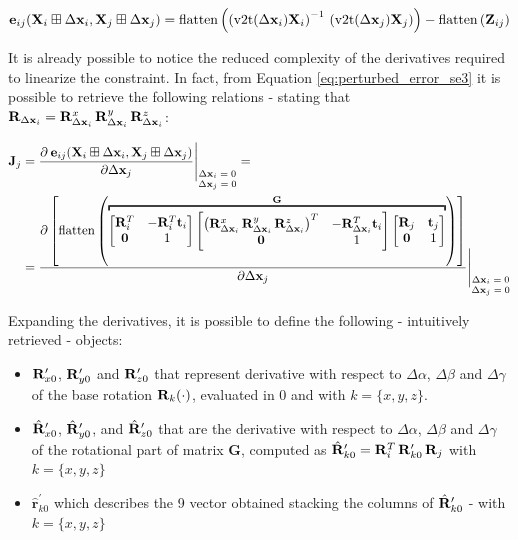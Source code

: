 \begin{equation}
    \label{eq:perturbed_error_se3}
    \error_{ij}(\SState_i \boxplus \dx_i, \SState_j \boxplus \dx_j) = \flatten{\left(\v2t(\dx_i)\SState_i\right)^{-1}\,\left(\v2t(\dx_j)\SState_j\right)} - \flatten{\Meas_{ij}}
\end{equation}

\noindent It is already possible to notice the reduced complexity of the derivatives required to linearize the constraint. In fact, from Equation \ref{eq:perturbed_error_se3} it is possible to retrieve the following relations - stating that $\mathbf{R}_{\Delta \mathbf{x}_i} = \mathbf{R}_{\Delta \mathbf{x}_i}^x \, \mathbf{R}_{\Delta \mathbf{x}_i}^y \, \mathbf{R}_{\Delta \mathbf{x}_i}^z$:

\begin{align*}
    \jacob_j &= \frac{\partial\: \error_{ij}(\SState_i \boxplus \dx_i, \SState_j \boxplus \dx_j)}{\partial \dx_j} \Bigg \rvert_{\scriptsize\begin{matrix} \dx_i = 0\\\dx_j = 0\end{matrix}} = \\
    &= \frac{\partial \left[\flatten{\overbracket{\begin{bmatrix}\rot_i^T & -\rot_i^T \trans_i \\\zero & 1\end{bmatrix} \begin{bmatrix}\left(\rot_{\dx_i}^x \, \rot_{\dx_i}^y \, \rot_{\dx_i}^z\right)^T & -\rot_{\dx_i}^T \trans_i \\\zero & 1\end{bmatrix} \begin{bmatrix}\rot_j & \trans_j \\\zero & 1\end{bmatrix}}^{\mathbf{G}}}\right]}{\partial \dx_j} \Bigg \rvert_{\scriptsize\begin{matrix} \dx_i = 0\\\dx_j = 0\end{matrix}} 
\end{align*}

\noindent Expanding the derivatives, it is possible to define the following - intuitively retrieved - objects:

\begin{itemize}
    \item  $\mathbf{R}_{x0}^{\prime}$, $\mathbf{R}_{y0}^{\prime}$ and $\mathbf{R}_{z0}^{\prime}$ that represent derivative with respect to $\Delta\alpha$, $\Delta\beta$ and $\Delta\gamma$ of the base rotation $\mathbf{R}_k(\cdot)$, evaluated in 0 and with $k = \{x,y,z\}$.
    \item  $\hat{\mathbf{R}}_{x0}^{\prime}$, $\hat{\mathbf{R}}_{y0}^{\prime}$, and $\hat{\mathbf{R}}_{z0}^{\prime}$ that are the derivative with respect to $\Delta\alpha$, $\Delta\beta$ and $\Delta\gamma$ of the rotational part of matrix $\mathbf{G}$, computed as $\hat{\mathbf{R}}_{k0}^{\prime} = \mathbf{R}_{i}^T \, \mathbf{R}_{k0}^{\prime} \, \mathbf{R}_j$ with $k = \{x,y,z\}$
    \item $\hat{\mathbf{r}}_{k0}^{\prime}$ which describes the 9 vector obtained stacking the columns of $\hat{\mathbf{R}}_{k0}^{\prime}$ - with $k = \{x,y,z\}$
\end{itemize}

